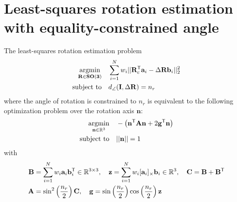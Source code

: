\section{Least-squares rotation estimation with equality-constrained angle}
\label{proof:wls-relax-eq-constrained-rotation}

\begin{theorem}
	\label{thm:constrained-wahba-davenport}
	The least-squares rotation estimation problem 
	\begin{equation}
		\label{eq:tls-rwls-a}
		\begin{aligned}
			\operatorname*{argmin}_{\mathbf{R} \in \mathbf{SO(3)}}  \quad &\sum_{i=1}^{N} w_i ||\mathbf{R}_c^{\mathsf{T}} \mathbf{a}_i - \Delta\mathbf{R} \mathbf{b}_i ||_2^2 \\
			\text{subject to} \quad &d_{\angle}(\mathbf{I}, \Delta\mathbf{R}) = n_r
		\end{aligned}
	\end{equation}
	where the angle of rotation is constrained to $n_r$ is equivalent to the following optimization problem over the rotation axis $\mathbf{n}$:
	\begin{equation}
		\label{eq:rot-est-constrained-qcqp}
		\begin{aligned}
			\operatorname*{argmin}_{\mathbf{n} \in \mathbb{R}^3} \quad &-\left(\mathbf{n}^{\mathsf{T}} \mathbf{A} \mathbf{n} + 2 \mathbf{g}^{\mathsf{T}} \mathbf{n} \right)\\
			\text{subject to} \quad &|| \mathbf{n}|| = 1\\
		\end{aligned}
	\end{equation}
	with
	\begin{equation}
		\label{eq:ev-constr-data-mat-a}
		\begin{aligned}
			\mathbf{B} &= \sum_{i=1}^N w_i \mathbf{a}_i\mathbf{b}_i^{\mathsf{T}} \in \mathbb{R}^{3 \times 3}, \quad
			\mathbf{z} = \sum_{i=1}^N w_i [\mathbf{a}_i]_{\times}\mathbf{b}_i \in \mathbb{R}^{3}, \quad \mathbf{C} = \mathbf{B} + \mathbf{B}^{\mathsf{T}}\\
			\mathbf{A} &= \sin^2 \left(\frac{n_r}{2} \right) \mathbf{C}, \quad \mathbf{g} =  \sin \left(\frac{n_r}{2} \right) \cos \left(\frac{n_r}{2} \right) \mathbf{z}
		\end{aligned}
	\end{equation}
\end{theorem}

